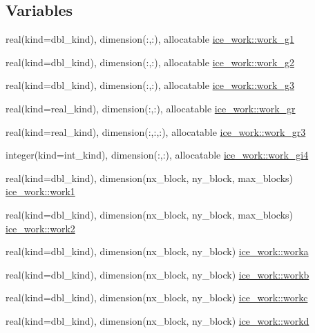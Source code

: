 \subsection*{Variables}
\begin{DoxyCompactItemize}
\item 
real(kind=dbl\_\-kind), dimension(:,:), allocatable \hyperlink{namespaceice__work_a6feb68d353a0240588d528748fecab4c}{ice\_\-work::work\_\-g1}
\item 
real(kind=dbl\_\-kind), dimension(:,:), allocatable \hyperlink{namespaceice__work_abfbbe39f5e047d0db457513d4f779e15}{ice\_\-work::work\_\-g2}
\item 
real(kind=dbl\_\-kind), dimension(:,:), allocatable \hyperlink{namespaceice__work_a929bf2491f92c1f877144e7551e715b2}{ice\_\-work::work\_\-g3}
\item 
real(kind=real\_\-kind), dimension(:,:), allocatable \hyperlink{namespaceice__work_aac80d822929fda3078c9f14d2232e309}{ice\_\-work::work\_\-gr}
\item 
real(kind=real\_\-kind), dimension(:,:,:), allocatable \hyperlink{namespaceice__work_a0891f9d671557b4379b9685923a8b4b2}{ice\_\-work::work\_\-gr3}
\item 
integer(kind=int\_\-kind), dimension(:,:), allocatable \hyperlink{namespaceice__work_af91dc6e8e0c9382cf3f2a9b6e5cd8f05}{ice\_\-work::work\_\-gi4}
\item 
real(kind=dbl\_\-kind), dimension(nx\_\-block, ny\_\-block, max\_\-blocks) \hyperlink{namespaceice__work_a5099225ca0b3af312ef912afa606cbce}{ice\_\-work::work1}
\item 
real(kind=dbl\_\-kind), dimension(nx\_\-block, ny\_\-block, max\_\-blocks) \hyperlink{namespaceice__work_af68c18020956e2cb0b298ccb87d24ece}{ice\_\-work::work2}
\item 
real(kind=dbl\_\-kind), dimension(nx\_\-block, ny\_\-block) \hyperlink{namespaceice__work_aa80691ca530fe4509dd7271288a7b2b8}{ice\_\-work::worka}
\item 
real(kind=dbl\_\-kind), dimension(nx\_\-block, ny\_\-block) \hyperlink{namespaceice__work_a380e9742bb40ec20a9fd1c2ac2995c2f}{ice\_\-work::workb}
\item 
real(kind=dbl\_\-kind), dimension(nx\_\-block, ny\_\-block) \hyperlink{namespaceice__work_aac3c0417ddea094a63ce0e98fc0b2a82}{ice\_\-work::workc}
\item 
real(kind=dbl\_\-kind), dimension(nx\_\-block, ny\_\-block) \hyperlink{namespaceice__work_acd825d38351494ad264a79c5795e4769}{ice\_\-work::workd}
\end{DoxyCompactItemize}
